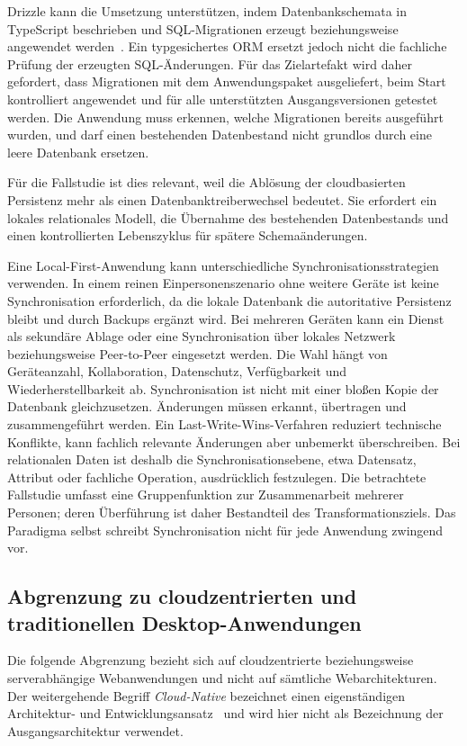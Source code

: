 Drizzle kann die Umsetzung unterstützen, indem Datenbankschemata in TypeScript beschrieben und SQL-Migrationen erzeugt beziehungsweise angewendet werden~\cite{drizzle2026docs}.
Ein typgesichertes ORM ersetzt jedoch nicht die fachliche Prüfung der erzeugten SQL-Änderungen.
Für das Zielartefakt wird daher gefordert, dass Migrationen mit dem Anwendungspaket ausgeliefert, beim Start kontrolliert angewendet und für alle unterstützten Ausgangsversionen getestet werden.
Die Anwendung muss erkennen, welche Migrationen bereits ausgeführt wurden, und darf einen bestehenden Datenbestand nicht grundlos durch eine leere Datenbank ersetzen.

Für die Fallstudie ist dies relevant, weil die Ablösung der cloudbasierten Persistenz mehr als einen Datenbanktreiberwechsel bedeutet.
Sie erfordert ein lokales relationales Modell, die Übernahme des bestehenden Datenbestands und einen kontrollierten Lebenszyklus für spätere Schemaänderungen.

Eine Local-First-Anwendung kann unterschiedliche Synchronisationsstrategien verwenden.
In einem reinen Einpersonenszenario ohne weitere Geräte ist keine Synchronisation erforderlich, da die lokale Datenbank die autoritative Persistenz bleibt und durch Backups ergänzt wird.
Bei mehreren Geräten kann ein Dienst als sekundäre Ablage oder eine Synchronisation über lokales Netzwerk beziehungsweise Peer-to-Peer eingesetzt werden.
Die Wahl hängt von Geräteanzahl, Kollaboration, Datenschutz, Verfügbarkeit und Wiederherstellbarkeit ab.
Synchronisation ist nicht mit einer bloßen Kopie der Datenbank gleichzusetzen.
Änderungen müssen erkannt, übertragen und zusammengeführt werden.
Ein Last-Write-Wins-Verfahren reduziert technische Konflikte, kann fachlich relevante Änderungen aber unbemerkt überschreiben.
Bei relationalen Daten ist deshalb die Synchronisationsebene, etwa Datensatz, Attribut oder fachliche Operation, ausdrücklich festzulegen.
Die betrachtete Fallstudie umfasst eine Gruppenfunktion zur Zusammenarbeit mehrerer Personen; deren Überführung ist daher Bestandteil des Transformationsziels.
Das Paradigma selbst schreibt Synchronisation nicht für jede Anwendung zwingend vor.
\subsection{Abgrenzung zu cloudzentrierten und traditionellen Desktop-Anwendungen}
\label{sec:abgrenzung-anwendungsmodelle}
Die folgende Abgrenzung bezieht sich auf cloudzentrierte beziehungsweise serverabhängige Webanwendungen und nicht auf sämtliche Webarchitekturen.
Der weitergehende Begriff \emph{Cloud-Native} bezeichnet einen eigenständigen Architektur- und Entwicklungsansatz~\cite{cncf2024cloudnative} und wird hier nicht als Bezeichnung der Ausgangsarchitektur verwendet.

